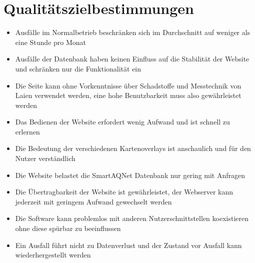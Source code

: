 \section{Qualitätszielbestimmungen}
\begin{itemize} [noitemsep]
    \item Ausfälle im Normalbetrieb beschränken sich im Durchschnitt auf weniger als eine Stunde pro Monat
    \item Ausfälle der Datenbank haben keinen Einfluss auf die Stabilität der Website und schränken nur die Funktionalität ein
    \item Die Seite kann ohne Vorkenntnisse über Schadstoffe und Messtechnik von Laien verwendet werden, eine hohe Benutzbarkeit muss also gewährleistet werden
    \item Das Bedienen der Website erfordert wenig Aufwand und ist schnell zu erlernen
    \item Die Bedeutung der verschiedenen \glspl{Kartenoverlay} ist anschaulich und für den Nutzer verständlich
    \item Die Website belastet die \gls{SmartAQNet} Datenbank nur gering mit Anfragen
    \item Die Übertragbarkeit der Website ist gewährleistet, der Webserver kann jederzeit mit geringem Aufwand gewechselt werden
    \item Die Software kann problemlos mit anderen Nutzerschnittstellen koexistieren ohne diese spürbar zu beeinflussen
    \item Ein Ausfall führt nicht zu Datenverlust und der Zustand vor Ausfall kann wiederhergestellt werden
\end{itemize}